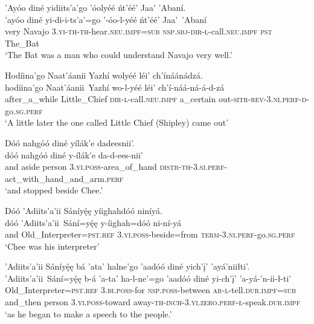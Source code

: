 \ea\label{ex:text1-31-7}
’Ayóo diné yidiits’a’go ’óolyéé ńt’éé’ Jaa’ ’Abaní.\\
\gll ’ayóo	diné	yi-di-i-ts’a’=go	’-óo-l-yéé	ńt’éé’	Jaa’~{’Abaní}\\
     very	Navajo	3.\textsc{yi}-\textsc{th}-\textsc{th}-hear.\textsc{neu}.\textsc{impf}=\textsc{sub}	\textsc{nsp}.\textsc{sbj}-\textsc{dir}-\textsc{l}-call.\textsc{neu}.\textsc{impf}	\textsc{pst}	The\_Bat\\
\glt `The Bat was a man who could understand Navajo very well.'
\z

\newpage
\ea\label{ex:text1-31-8}
Hodíina’go Naat’áanii Yazhí wolyéé léi’ ch’ínáánádzá.\\
\gll hodíina’go	Naat’áanii~{Yazhí}	wo-l-yéé	léi’	ch’í-náá-ná-á-d-zá\\
     after\_a\_while	Little\_Chief	\textsc{dir}-\textsc{l}-call.\textsc{neu}.\textsc{impf}	a\_certain	out-\textsc{sitr}-\textsc{rev}-3.\textsc{ni}.\textsc{perf}-\textsc{d}-go.\textsc{sg}.\textsc{perf}\\
\glt `A little later the one called Little Chief (Shipley) came out'
\z

\ea\label{ex:text1-31-9}
Dóó nahgóó diné yílák’e dadeesnii’.\\
\gll dóó	nahgóó	diné	y-ílák’e	da-d-ees-nii’\\
     and	aside	person	3.\textsc{yi}.\textsc{poss}-area\_of\_hand	\textsc{distr}-\textsc{th}-3.\textsc{si}.\textsc{perf}-act\_with\_hand\_and\_arm.\textsc{perf}\\
\glt `and stopped beside Chee.'
\z

\ea\label{ex:text1-31-10}
Dóó ’Adiits’a’ii Sáníyę́ę yíighahdóó niníyá.\\
\gll dóó	’Adiits’a’ii~{Sání=yę́ę}	y-íighah=dóó	ni-ní-yá\\
     and	Old\_Interpreter=\textsc{pst}.\textsc{ref}	3.\textsc{yi}.\textsc{poss}-beside=from	\textsc{term}-3.\textsc{ni}.\textsc{perf}-go.\textsc{sg}.\textsc{perf}\\
\glt `Chee was his interpreter'
\z

\ea\label{ex:text1-31-11}
’Adiits’a’ii Sáníyę́ę bá ’ata’ halne’go ’aadóó diné yich’į’ ’ayá’niiłti’.\\
\gll ’Adiits’a’ii~{Sání=yę́ę}	b-á	’a-ta’	ha-l-ne’=go	’aadóó	diné	yi-ch’į’	’a-yá-’n-ii-ł-ti’\\
     Old\_Interpreter=\textsc{pst}.\textsc{ref}	3.\textsc{bi}.\textsc{poss}-for	\textsc{nsp}.\textsc{poss}-between	\textsc{ar}-\textsc{l}-tell.\textsc{dur}.\textsc{impf}=\textsc{sub}	and\_then	person	3.\textsc{yi}.\textsc{poss}-toward	away-\textsc{th}-\textsc{inch}-3.\textsc{yi}.\textsc{zero}.\textsc{perf}-\textsc{ł}-speak.\textsc{dur}.\textsc{impf}\\
\glt `as he began to make a speech to the people.'
\z

